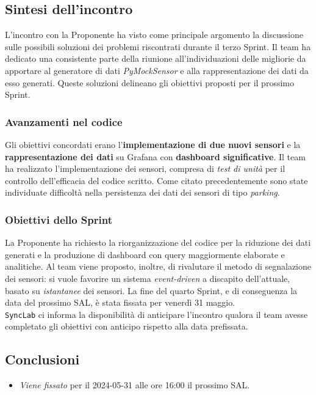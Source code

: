 \documentclass[8pt]{article}
\begin{document}
\subsection{Sintesi dell'incontro}
L'incontro con la Proponente ha visto come principale argomento la discussione sulle possibili soluzioni dei problemi riscontrati durante il terzo Sprint. Il team ha dedicato una consistente parte della riunione all'individuazioni delle migliorie da apportare al generatore di dati \textit{PyMockSensor} e alla rappresentazione dei dati da esso generati. Queste soluzioni delineano gli obiettivi proposti per il prossimo Sprint.

\subsubsection{Avanzamenti nel codice}
Gli obiettivi concordati erano l'\textbf{implementazione di due nuovi sensori} e la \textbf{rappresentazione dei dati} su Grafana con \textbf{dashboard significative}. Il team ha realizzato l'implementazione dei sensori, compresa di \textit{test di unità} per il controllo dell'efficacia del codice scritto. Come citato precedentemente sono state individuate difficoltà nella persistenza dei dati dei sensori di tipo \textit{parking}.

\subsubsection{Obiettivi dello Sprint}
La Proponente ha richiesto la riorganizzazione del codice per la riduzione dei dati generati e la produzione di dashboard con query maggiormente elaborate e analitiche. Al team viene proposto, inoltre, di rivalutare il metodo di segnalazione dei sensori: si vuole favorire un sistema \textit{event-driven} a discapito dell'attuale, basato su \textit{istantanee} dei sensori. La fine del quarto Sprint, e di conseguenza la data del prossimo SAL, è stata fissata per venerdì 31 maggio.\\
\texttt{SyncLab} ci informa la disponibilità di anticipare l'incontro qualora il team avesse completato gli obiettivi con anticipo rispetto alla data prefissata.

\subsection{Conclusioni}
\begin{itemize}
	\setlength\itemsep{0em}
	\item \textit{Viene fissato} per il 2024-05-31 alle ore 16:00 il prossimo SAL.
\end{itemize}
\end{document}
